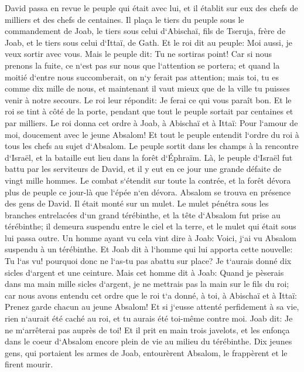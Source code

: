 \verse David passa en revue le peuple qui était avec lui, et il établit sur eux des chefs de milliers et des chefs de centaines. 
\verse Il plaça le tiers du peuple sous le commandement de Joab, le tiers sous celui d`Abischaï, fils de Tseruja, frère de Joab, et le tiers sous celui d`Ittaï, de Gath. Et le roi dit au peuple: Moi aussi, je veux sortir avec vous. 
\verse Mais le peuple dit: Tu ne sortiras point! Car si nous prenons la fuite, ce n`est pas sur nous que l`attention se portera; et quand la moitié d`entre nous succomberait, on n`y ferait pas attention; mais toi, tu es comme dix mille de nous, et maintenant il vaut mieux que de la ville tu puisses venir à notre secours. 
\verse Le roi leur répondit: Je ferai ce qui vous paraît bon. Et le roi se tint à côté de la porte, pendant que tout le peuple sortait par centaines et par milliers. 
\verse Le roi donna cet ordre à Joab, à Abischaï et à Ittaï: Pour l`amour de moi, doucement avec le jeune Absalom! Et tout le peuple entendit l`ordre du roi à tous les chefs au sujet d`Absalom. 
\verse Le peuple sortit dans les champs à la rencontre d`Israël, et la bataille eut lieu dans la forêt d`Éphraïm. 
\verse Là, le peuple d`Israël fut battu par les serviteurs de David, et il y eut en ce jour une grande défaite de vingt mille hommes. 
\verse Le combat s`étendit sur toute la contrée, et la forêt dévora plus de peuple ce jour-là que l`épée n`en dévora. 
\verse Absalom se trouva en présence des gens de David. Il était monté sur un mulet. Le mulet pénétra sous les branches entrelacées d`un grand térébinthe, et la tête d`Absalom fut prise au térébinthe; il demeura suspendu entre le ciel et la terre, et le mulet qui était sous lui passa outre. 
\verse Un homme ayant vu cela vint dire à Joab: Voici, j`ai vu Absalom suspendu à un térébinthe. 
\verse Et Joab dit à l`homme qui lui apporta cette nouvelle: Tu l`as vu! pourquoi donc ne l`as-tu pas abattu sur place? Je t`aurais donné dix sicles d`argent et une ceinture. 
\verse Mais cet homme dit à Joab: Quand je pèserais dans ma main mille sicles d`argent, je ne mettrais pas la main sur le fils du roi; car nous avons entendu cet ordre que le roi t`a donné, à toi, à Abischaï et à Ittaï: Prenez garde chacun au jeune Absalom! 
\verse Et si j`eusse attenté perfidement à sa vie, rien n`aurait été caché au roi, et tu aurais été toi-même contre moi. 
\verse Joab dit: Je ne m`arrêterai pas auprès de toi! Et il prit en main trois javelots, et les enfonça dans le coeur d`Absalom encore plein de vie au milieu du térébinthe. 
\verse Dix jeunes gens, qui portaient les armes de Joab, entourèrent Absalom, le frappèrent et le firent mourir. 
